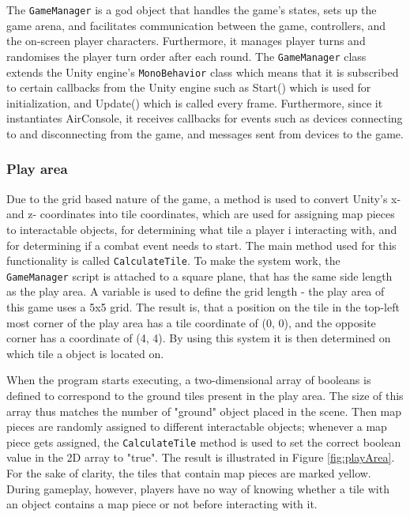 The \texttt{GameManager} is a god object that handles the game’s states, sets up the game arena, and facilitates communication between the game,  controllers, and the on-screen player characters. Furthermore, it manages player turns and randomises the player turn order after each round. The \texttt{GameManager} class extends the Unity engine’s \texttt{MonoBehavior} class which means that it is subscribed to certain callbacks from the Unity engine such as Start() which is used for initialization, and Update() which is called every frame. Furthermore, since it instantiates AirConsole, it receives callbacks for events such as devices connecting to and disconnecting from the game, and messages sent from devices to the game. 

\subsubsection{Play area}\label{sec:playArea}
Due to the grid based nature of the game, a method is used to convert Unity's x- and z- coordinates into tile coordinates, which are used for assigning map pieces to interactable objects, for determining what tile a player i interacting with, and for determining if a combat event needs to start. The main method used for this functionality is called \texttt{CalculateTile}. To make the system work, the \texttt{GameManager} script is attached to a square plane, that has the same side length as the play area. A variable is used to define the grid length - the play area of this game uses a 5x5 grid. The result is, that a position on the tile in the top-left most corner of the play area has a tile coordinate of (0, 0), and the opposite corner has a coordinate of (4, 4). By using this system it is then determined on which tile a object is located on.

When the program starts executing, a two-dimensional array of booleans is defined to correspond to the ground tiles present in the play area. The size of this array thus matches the number of "ground" object placed in the scene. Then map pieces are randomly assigned to different interactable objects; whenever a map piece gets assigned, the \texttt{CalculateTile} method is used to set the correct boolean value in the 2D array to "true". The result is illustrated in Figure \ref{fig:playArea}. For the sake of clarity, the tiles that contain map pieces are marked yellow. During gameplay, however, players have no way of knowing whether a tile with an object contains a map piece or not before interacting with it.

